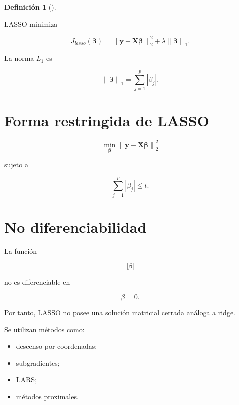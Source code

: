 \documentclass[
  spanish,
  10.5pt,
  letterpaper,
  DIV=11,
  numbers=noendperiod,
  oneside,
  open=any]{scrreprt}
\providecommand{\tightlist}{%
  \setlength{\itemsep}{0pt}\setlength{\parskip}{0pt}}
\theoremstyle{definition}
\newtheorem{definition}{Definición}[chapter]
\theoremstyle{definition}
\theoremstyle{plain}
\theoremstyle{remark}
\begin{document}

\begin{definition}[]\protect\hypertarget{def-lasso}{}\label{def-lasso}

LASSO minimiza

\[
J_{lasso}(\boldsymbol{\beta})
=
\left\|
\mathbf{y}
-
\mathbf{X}\boldsymbol{\beta}
\right\|_2^2
+
\lambda
\left\|
\boldsymbol{\beta}
\right\|_1.
\]

\end{definition}

La norma \(L_1\) es

\[
\left\|
\boldsymbol{\beta}
\right\|_1
=
\sum_{j=1}^{p}
|\beta_j|.
\]

\section*{Forma restringida de LASSO}\label{forma-restringida-de-lasso}


\[
\min_{\boldsymbol{\beta}}
\left\|
\mathbf{y}
-
\mathbf{X}\boldsymbol{\beta}
\right\|_2^2
\]

sujeto a

\[
\sum_{j=1}^{p}
|\beta_j|
\leq
t.
\]

\section*{No diferenciabilidad}\label{no-diferenciabilidad}


La función

\[
|\beta|
\]

no es diferenciable en

\[
\beta=0.
\]

Por tanto, LASSO no posee una solución matricial cerrada análoga a
ridge.

Se utilizan métodos como:

\begin{itemize}
\tightlist
\item
  descenso por coordenadas;
\item
  subgradientes;
\item
  LARS;
\item
  métodos proximales.
\end{itemize}
\end{document}
